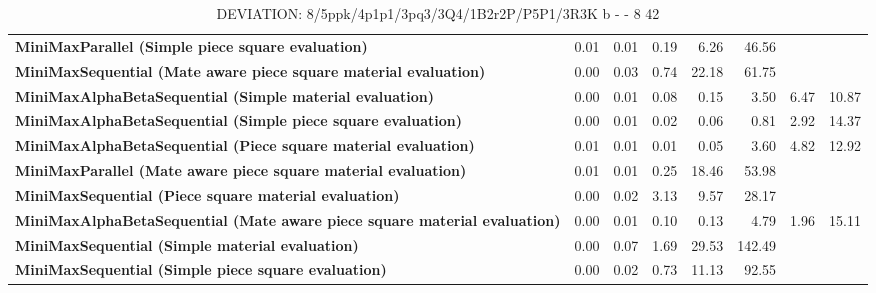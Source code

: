 \begin{table}[H]
{\begin{tabular}{|p{8cm}|*{7}{r|}}
\rowcolor[HTML]{FFFFFF}
\textbf{MiniMaxParallel (Simple piece square evaluation)}               & 0.01 & 0.01 & 0.19 & 6.26 & 46.56 &  &  \\

\rowcolor[HTML]{EFEFEF}
\textbf{MiniMaxSequential (Mate aware piece square material evaluation)}               & 0.00 & 0.03 & 0.74 & 22.18 & 61.75 &  &  \\

\rowcolor[HTML]{FFFFFF}
\textbf{MiniMaxAlphaBetaSequential (Simple material evaluation)}               & 0.00 & 0.01 & 0.08 & 0.15 & 3.50 & 6.47 & 10.87 \\

\rowcolor[HTML]{EFEFEF}
\textbf{MiniMaxAlphaBetaSequential (Simple piece square evaluation)}               & 0.00 & 0.01 & 0.02 & 0.06 & 0.81 & 2.92 & 14.37 \\

\rowcolor[HTML]{FFFFFF}
\textbf{MiniMaxAlphaBetaSequential (Piece square material evaluation)}               & 0.01 & 0.01 & 0.01 & 0.05 & 3.60 & 4.82 & 12.92 \\

\rowcolor[HTML]{EFEFEF}
\textbf{MiniMaxParallel (Mate aware piece square material evaluation)}               & 0.01 & 0.01 & 0.25 & 18.46 & 53.98 &  &  \\

\rowcolor[HTML]{FFFFFF}
\textbf{MiniMaxSequential (Piece square material evaluation)}               & 0.00 & 0.02 & 3.13 & 9.57 & 28.17 &  &  \\

\rowcolor[HTML]{EFEFEF}
\textbf{MiniMaxAlphaBetaSequential (Mate aware piece square material evaluation)}               & 0.00 & 0.01 & 0.10 & 0.13 & 4.79 & 1.96 & 15.11 \\

\rowcolor[HTML]{FFFFFF}
\textbf{MiniMaxSequential (Simple material evaluation)}               & 0.00 & 0.07 & 1.69 & 29.53 & 142.49 &  &  \\

\rowcolor[HTML]{EFEFEF}
\textbf{MiniMaxSequential (Simple piece square evaluation)}               & 0.00 & 0.02 & 0.73 & 11.13 & 92.55 &  &  \\

            \hline
        \end{tabular}%
    }
    \caption{DEVIATION: 8/5ppk/4p1p1/3pq3/3Q4/1B2r2P/P5P1/3R3K b - - 8 42}
    \label{tab:end-game---deflection---short-deviation}
\end{table}
